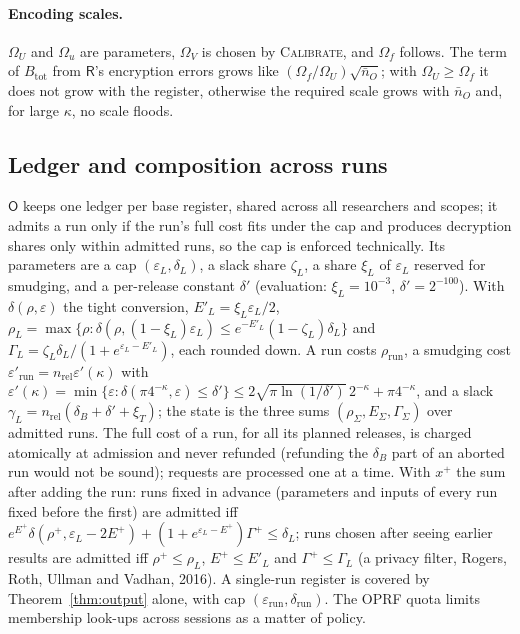 \documentclass[11pt]{article}
\theoremstyle{definition}
\theoremstyle{plain}
\newcommand{\Rp}{\mathsf{R}}
\newcommand{\Op}{\mathsf{O}}
\begin{document}
\paragraph{Encoding scales.} $\Omega_U$ and $\Omega_u$ are parameters, $\Omega_V$ is chosen by \textsc{Calibrate}, and $\Omega_f$ follows. The term of $B_{\mathrm{tot}}$ from $\Rp$'s encryption errors grows like $(\Omega_f/\Omega_U)\sqrt{\bar n_O}$; with $\Omega_U\ge\Omega_f$ it does not grow with the register, otherwise the required scale grows with $\bar n_O$ and, for large $\kappa$, no scale floods.

\subsection*{Ledger and composition across runs}
\label{sec:ledger}
$\Op$ keeps one ledger per base register, shared across all researchers and scopes; it admits a run only if the run's full cost fits under the cap and produces decryption shares only within admitted runs, so the cap is enforced technically. Its parameters are a cap $(\varepsilon_L,\delta_L)$, a slack share $\zeta_L$, a share $\xi_L$ of $\varepsilon_L$ reserved for smudging, and a per-release constant $\delta'$ (evaluation: $\xi_L=10^{-3}$, $\delta'=2^{-100}$). With $\delta(\rho,\varepsilon)$ the tight conversion, $E'_L=\xi_L\varepsilon_L/2$, $\rho_L=\max\{\rho:\delta(\rho,(1-\xi_L)\varepsilon_L)\le e^{-E'_L}(1-\zeta_L)\delta_L\}$ and $\Gamma_L=\zeta_L\delta_L/(1+e^{\varepsilon_L-E'_L})$, each rounded down. A run costs $\rho_{\mathrm{run}}$, a smudging cost $\varepsilon'_{\mathrm{run}}=n_{\mathrm{rel}}\varepsilon'(\kappa)$ with $\varepsilon'(\kappa)=\min\{\varepsilon:\delta(\pi4^{-\kappa},\varepsilon)\le\delta'\}\le2\sqrt{\pi\ln(1/\delta')}\,2^{-\kappa}+\pi4^{-\kappa}$, and a slack $\gamma_L=n_{\mathrm{rel}}(\delta_B+\delta'+\xi_T)$; the state is the three sums $(\rho_\Sigma,E_\Sigma,\Gamma_\Sigma)$ over admitted runs. The full cost of a run, for all its planned releases, is charged atomically at admission and never refunded (refunding the $\delta_B$ part of an aborted run would not be sound); requests are processed one at a time. With $x^+$ the sum after adding the run: runs fixed in advance (parameters and inputs of every run fixed before the first) are admitted iff $e^{E^+}\delta(\rho^+,\varepsilon_L-2E^+)+(1+e^{\varepsilon_L-E^+})\Gamma^+\le\delta_L$; runs chosen after seeing earlier results are admitted iff $\rho^+\le\rho_L$, $E^+\le E'_L$ and $\Gamma^+\le\Gamma_L$ (a privacy filter, Rogers, Roth, Ullman and Vadhan, 2016). A single-run register is covered by Theorem~\ref{thm:output} alone, with cap $(\varepsilon_{\mathrm{run}},\delta_{\mathrm{run}})$. The OPRF quota limits membership look-ups across sessions as a matter of policy.
\end{document}
